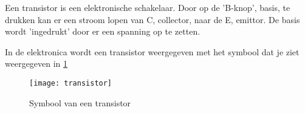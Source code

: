 Een transistor is een elektronische schakelaar. Door op de 'B-knop', basis, te drukken kan er een stroom lopen van C, collector, naar de E, emittor. De basis wordt 'ingedrukt' door er een spanning op te zetten.

In de elektronica wordt een transistor weergegeven met het symbool dat je ziet weergegeven in \ref{symbool:transistor}

\begin{figure}[h]
\texttt{[image: transistor]}
\centering
\caption{Symbool van een transistor}
\label{symbool:transistor}
\end{figure}

